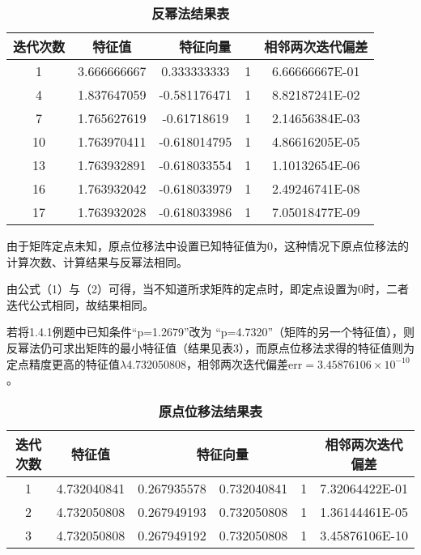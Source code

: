 \documentclass[12pt, a4paper, oneside]{ctexart}
\begin{document}
\begin{table}[h]
	\centering
	\caption{\textbf{反幂法结果表}}
	\begin{tabular}{c|c|cc|c}
		\hline
		迭代次数 & 特征值         & \multicolumn{2}{c|}{特征向量} & 相邻两次迭代偏差       \\ \hline
		1    & 3.666666667 & 0.333333333       & 1     & 6.66666667E-01 \\
		4    & 1.837647059 & -0.581176471      & 1     & 8.82187241E-02 \\
		7    & 1.765627619 & -0.61718619       & 1     & 2.14656384E-03 \\
		10   & 1.763970411 & -0.618014795      & 1     & 4.86616205E-05 \\
		13   & 1.763932891 & -0.618033554      & 1     & 1.10132654E-06 \\
		16   & 1.763932042 & -0.618033979      & 1     & 2.49246741E-08 \\
		17   & 1.763932028 & -0.618033986      & 1     & 7.05018477E-09 \\ \hline
	\end{tabular}
\end{table}
	
	
	由于矩阵定点未知，原点位移法中设置已知特征值为0，这种情况下原点位移法的计算次数、计算结果与反幂法相同。
	
	
	由公式（1）与（2）可得，当不知道所求矩阵的定点时，即定点设置为0时，二者迭代公式相同，故结果相同。 
	
	
	若将1.4.1例题中已知条件“p=1.2679”改为 “p=4.7320”（矩阵的另一个特征值），则反幂法仍可求出矩阵的最小特征值（结果见表3），而原点位移法求得的特征值则为定点精度更高的特征值$\lambda$4.732050808，相邻两次迭代偏差$\text{err} =3.45876106\times 10^{-10}$。
	
	\begin{table}[h]
		\centering
		\caption{\textbf{原点位移法结果表}}
		\begin{tabular}{c|c|ccc|c}
			\hline
			迭代次数 & 特征值         & \multicolumn{3}{c|}{特征向量}     & 相邻两次迭代偏差       \\ \hline
			1    & 4.732040841 & 0.267935578 & 0.732040841 & 1 & 7.32064422E-01 \\
			2    & 4.732050808 & 0.267949193 & 0.732050808 & 1 & 1.36144461E-05 \\
			3    & 4.732050808 & 0.267949192 & 0.732050808 & 1 & 3.45876106E-10 \\ \hline
		\end{tabular}
	\end{table}
	
\end{document}
